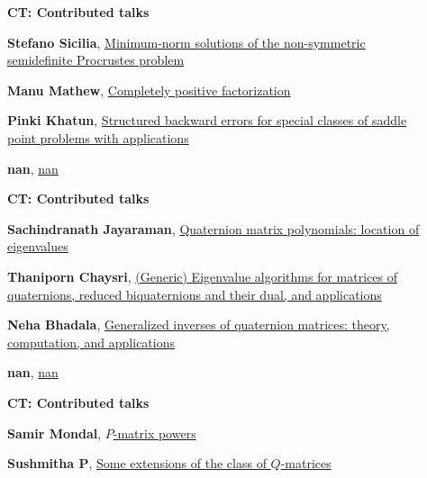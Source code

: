 \documentclass[ILAS2025-program.tex]{subfiles}
\begin{document}
\begin{description}
\begin{description}
        \end{description}
    \begin{description}
    \item[] {\color{mstitle}\textbf{CT: Contributed talks}} 
    \item[] \hypertarget{up0096}{}\textbf{Stefano Sicilia}, \hyperlink{down0096}{Minimum-norm solutions of the non-symmetric semidefinite Procrustes problem}
        \item[] \hypertarget{up0097}{}\textbf{Manu Mathew}, \hyperlink{down0097}{Completely positive factorization}
        \item[] \hypertarget{up0098}{}\textbf{Pinki Khatun}, \hyperlink{down0098}{Structured backward errors for special classes of saddle point problems with applications}
        \item[] \hypertarget{up0099}{}\textbf{nan}, \hyperlink{down0099}{nan}
        \end{description}
    \begin{description}
    \item[] {\color{mstitle}\textbf{CT: Contributed talks}} 
    \item[] \hypertarget{up0100}{}\textbf{Sachindranath Jayaraman}, \hyperlink{down0100}{Quaternion matrix polynomials: location of eigenvalues}
        \item[] \hypertarget{up0101}{}\textbf{Thaniporn Chaysri}, \hyperlink{down0101}{(Generic) Eigenvalue algorithms for matrices of quaternions, reduced biquaternions and their dual, and applications}
        \item[] \hypertarget{up0102}{}\textbf{Neha Bhadala}, \hyperlink{down0102}{Generalized inverses of quaternion matrices: theory, computation, and applications}
        \item[] \hypertarget{up0103}{}\textbf{nan}, \hyperlink{down0103}{nan}
        \end{description}
    \begin{description}
    \item[] {\color{mstitle}\textbf{CT: Contributed talks}} 
    \item[] \hypertarget{up0104}{}\textbf{Samir Mondal}, \hyperlink{down0104}{$P$-matrix powers}
        \item[] \hypertarget{up0105}{}\textbf{Sushmitha P}, \hyperlink{down0105}{Some extensions of the class of $Q$-matrices}

\end{description}
\end{description}
\end{document}
